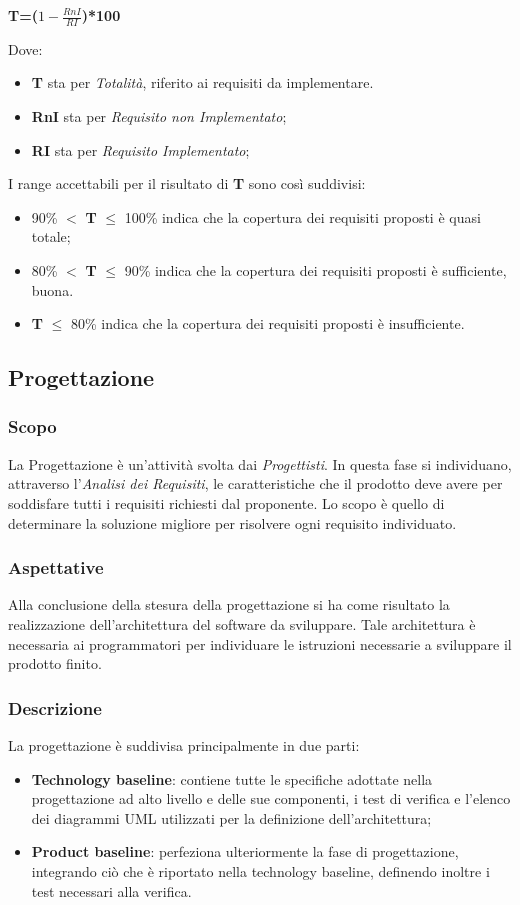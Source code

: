 \begin{center}
	\textbf{T=($1-\frac{RnI}{RI}$)*100}
\end{center}
Dove:
\begin{itemize}
	\item \textbf{T} sta per \textit{Totalità}, riferito ai requisiti da implementare.
	\item \textbf{RnI} sta per \textit{Requisito non Implementato};
	\item \textbf{RI} sta per \textit{Requisito Implementato};
\end{itemize}
I range accettabili per il risultato di \textbf{T} sono così suddivisi:
\begin{itemize}
	\item 90\% $<$ \textbf{T} $\leq$ 100\% indica che la copertura dei requisiti proposti è quasi totale;
	\item 80\% $<$ \textbf{T} $\leq$ 90\% indica che la copertura dei requisiti proposti è sufficiente, buona.
	\item \textbf{T} $\leq$ 80\% indica che la copertura dei requisiti proposti è insufficiente.
\end{itemize}


\subsection{Progettazione}\label{2.2.4}
\subsubsection{Scopo}\label{2.2.4.1}
La Progettazione è un'attività svolta dai \textit{Progettisti}. In questa fase si individuano, attraverso l'\textit{Analisi dei Requisiti}, le caratteristiche che il prodotto deve avere per soddisfare tutti i requisiti richiesti dal proponente. Lo scopo è quello di determinare la soluzione migliore per risolvere ogni requisito individuato. 
\subsubsection{Aspettative}\label{2.2.4.2}
Alla conclusione della stesura della progettazione si ha come risultato la realizzazione dell'architettura del software da sviluppare. Tale architettura è necessaria ai programmatori per individuare le istruzioni necessarie a sviluppare il prodotto finito.
\subsubsection{Descrizione}\label{2.2.4.3}
La progettazione è suddivisa principalmente in due parti:
\begin{itemize}
	\item \textbf{Technology baseline}: contiene tutte le specifiche adottate nella progettazione ad alto livello e delle sue componenti, i test di verifica e l'elenco dei diagrammi UML utilizzati per la definizione dell'architettura;
	\item \textbf{Product baseline}: perfeziona ulteriormente la fase di progettazione, integrando ciò che è riportato nella technology baseline, definendo inoltre i test necessari alla verifica.
\end{itemize}

